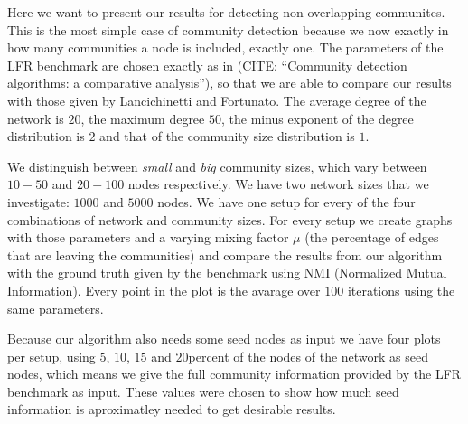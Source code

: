 Here we want to present our results for detecting non overlapping communites. This is the most simple case of community detection because we now exactly in how many communities a node is included, exactly one. The parameters of the LFR benchmark are chosen exactly as in (CITE: ``Community detection algorithms: a comparative analysis''), so that we are able to compare our results with those given by Lancichinetti and Fortunato. The average degree of the network is $20$, the maximum degree $50$, the minus exponent of the degree distribution is $2$ and that of the community size distribution is $1$.

We distinguish between \textit{small} and \textit{big} community sizes, which vary between $10 - 50$ and $20 - 100$ nodes respectively. We have two network sizes that we investigate: $1000$ and $5000$ nodes. We have one setup for every of the four combinations of network and community sizes. For every setup we create graphs with those parameters and a varying mixing factor $\mu$ (the percentage of edges that are leaving the communities) and compare the results from our algorithm with the ground truth given by the benchmark using NMI (Normalized Mutual Information). Every point in the plot is the avarage over $100$ iterations using the same parameters.

Because our algorithm also needs some seed nodes as input we have four plots per setup, using $5$, $10$, $15$ and $20$percent of the nodes of the network as seed nodes, which means we give the full community information provided by the LFR benchmark as input. These values were chosen to show how much seed information is aproximatley needed to get desirable results.